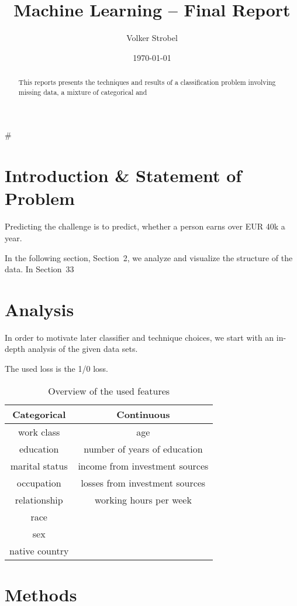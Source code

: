 #\documentclass{article}
\title{Machine Learning -- Final Report}
\author{Volker Strobel}
\date{\today}
\begin{document}
\maketitle

\begin{abstract}
  This reports presents the techniques and results of a classification
  problem involving missing data, a mixture of categorical and 
\end{abstract}

\section{Introduction \& Statement of Problem}

Predicting the challenge is to predict, whether a person earns over
EUR 40k a year.

In the following section, Section~2, we analyze and visualize the
structure of the data. In Section~33

\section{Analysis}

In order to motivate later classifier and technique choices, we start
with an in-depth analysis of the given data sets.

The used loss is the 1/0 loss.


\begin{table}[h]
  \centering
  \begin{tabular}{cc}
    \toprule
  Categorical & Continuous\\
    \midrule
    work class & age\\
    education & number of years of education\\
marital status & income from investment sources\\
occupation & losses from investment sources\\
relationship & working hours per week \\
race & \\
sex & \\
native country & \\
      \bottomrule
  \end{tabular}
  \caption{Overview of the used features}
  \label{tab:features}
\end{table}

\section{Methods}
\end{document}
